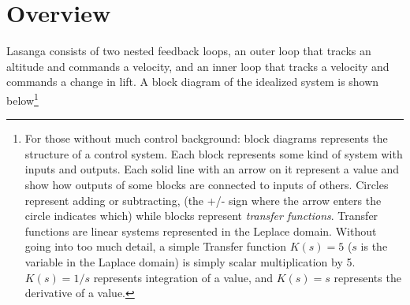 \documentclass[11pt]{article}
\begin{document}
\section{Overview}

Lasanga consists of two nested feedback loops, an outer loop that tracks an altitude and commands a velocity, and an inner loop that tracks a velocity and commands a change in lift. A block diagram of the idealized system is shown below\footnote{For those without much control background: block diagrams represents the structure of a control system. Each block represents some kind of system with inputs and outputs. Each solid line with an arrow on it represent a value and show how outputs of some blocks are connected to inputs of others. Circles represent adding or subtracting, (the +/- sign where the arrow enters the circle indicates which) while blocks represent \emph{transfer functions}. Transfer functions are linear systems represented in the Leplace domain. Without going into too much detail, a simple Transfer function $K(s) = 5$ ($s$ is the variable in the Laplace domain) is simply scalar multiplication by 5. $K(s) = 1/s$ represents integration of a value, and $K(s) = s$ represents the derivative of a value.}
\end{document}
